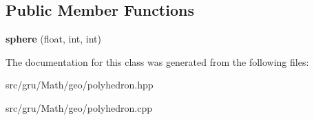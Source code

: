 \subsection*{\-Public \-Member \-Functions}
\begin{DoxyCompactItemize}
\item 
\hypertarget{classmath_1_1geo_1_1sphere_ad30f9edddc96ef9c7a4062e79694556d}{{\bfseries sphere} (float, int, int)}\label{classmath_1_1geo_1_1sphere_ad30f9edddc96ef9c7a4062e79694556d}

\end{DoxyCompactItemize}


\-The documentation for this class was generated from the following files\-:\begin{DoxyCompactItemize}
\item 
src/gru/\-Math/geo/polyhedron.\-hpp\item 
src/gru/\-Math/geo/polyhedron.\-cpp\end{DoxyCompactItemize}
